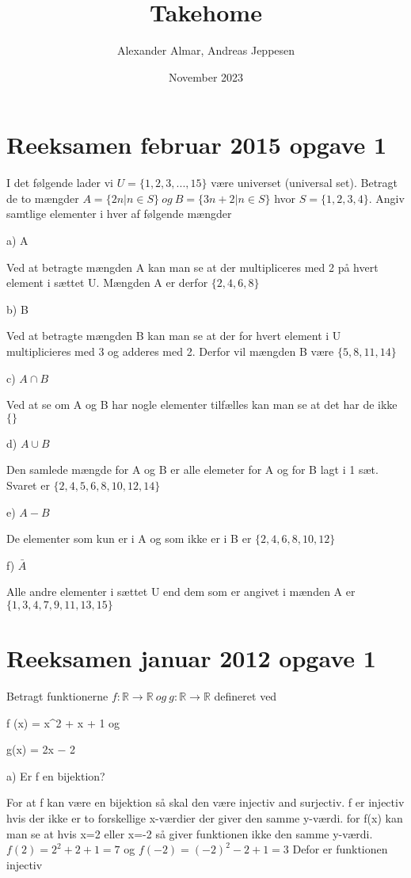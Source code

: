 \documentclass{article}
\title{Takehome}
\author{Alexander Almar, Andreas Jeppesen }
\date{November 2023}
\begin{document}
\maketitle

\section{Reeksamen februar 2015 opgave 1}
I det følgende lader vi \(U = \{1, 2, 3, . . . , 15\}\) være universet (universal set). Betragt de to mængder 
\(A = \{2n | n \in S\}\ og\ B = \{3n + 2 | n \in S\}\) hvor \(S = \{1, 2, 3, 4\}\). Angiv samtlige elementer i hver af følgende mængder

a) A

Ved at betragte mængden A kan man se at der multipliceres med 2 på hvert element i sættet U. Mængden A er derfor
\(\{2,4,6,8\}\)

b) B

Ved at betragte mængden B kan man se at der for hvert element i U multiplicieres med 3 og adderes med 2. Derfor vil mængden B være 
\(\{5,8,11,14\}\)

c) \(A \cap B\)

Ved at se om A og B har nogle elementer tilfælles kan man se at det har de ikke 
\(\{\}\)

d) \(A \cup B\)

Den samlede mængde for A og B er alle elemeter for A og for B lagt i 1 sæt. Svaret er 
\(\{2,4,5,6,8,10,12,14\}\)

e) \(A-B\)

De elementer som kun er i A og som ikke er i B er
\(\{2,4,6,8,10,12\}\)

f) \(\bar A \)

Alle andre elementer i sættet U end dem som er angivet i mænden A er 
\(\{1,3,4,7,9,11,13,15\}\)

\section{Reeksamen januar 2012 opgave 1}
Betragt funktionerne \(f : \mathbb{R} \rightarrow \mathbb{R}\ og\ g : \mathbb{R} \rightarrow \mathbb{R}\) defineret ved


f (x) = x^2 + x + 1 og

g(x) = 2x − 2


a) Er f en bijektion?


For at f kan være en bijektion så skal den være injectiv and surjectiv. f er injectiv hvis der ikke er to forskellige x-værdier der giver den samme y-værdi. for f(x) kan man se at hvis x=2 eller x=-2 så giver funktionen ikke den samme y-værdi. 
\(f(2)=2^2+2+1=7\) og \(f(-2)=(-2)^2-2+1=3\)
Defor er funktionen injectiv
\end{document}
